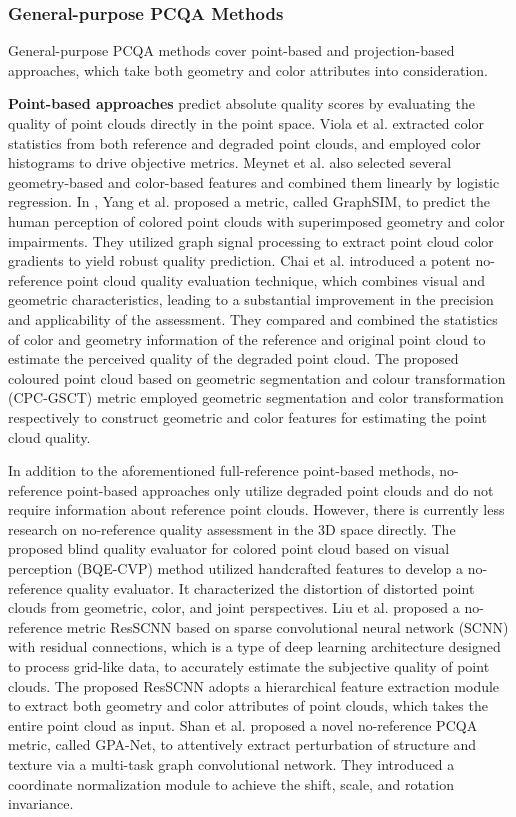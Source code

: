 \subsubsection{General-purpose PCQA Methods}

General-purpose PCQA methods cover point-based and projection-based approaches, which take both geometry and color attributes into consideration.

\textbf{Point-based approaches} predict absolute quality scores by evaluating the quality of point clouds directly in the point space. 
Viola et al. \citep{Violai20} extracted color statistics from both reference and degraded point clouds, and employed color histograms to drive objective metrics.
Meynet et al. \citep{Meynetg20} also selected several geometry-based and color-based features and combined them linearly by logistic regression.
In \citep{Yangq22}, Yang et al. proposed a metric, called GraphSIM, to predict the human perception of colored point clouds with superimposed geometry and color impairments.
They utilized graph signal processing to extract point cloud color gradients to yield robust quality prediction. 
Chai et al. \citep{Chai2024} introduced a potent no-reference point cloud quality evaluation technique, which combines visual and geometric characteristics, leading to a substantial improvement in the precision and applicability of the assessment.
They compared and combined the statistics of color and geometry information of the reference and original point cloud to estimate the perceived quality of the degraded point cloud.
The proposed coloured point cloud based on geometric segmentation and colour transformation (CPC-GSCT) \citep{Hual21} metric employed geometric segmentation and color transformation respectively to construct geometric and color features for estimating the point cloud quality.

In addition to the aforementioned full-reference point-based methods, no-reference point-based approaches only utilize degraded point clouds and do not require information about reference point clouds.
However, there is currently less research on no-reference quality assessment in the 3D space directly.
The proposed blind quality evaluator for colored point cloud based on visual perception (BQE-CVP) method \citep{Hual21cvp} utilized handcrafted features to develop a no-reference quality evaluator.  
It characterized the distortion of distorted point clouds from geometric, color, and joint perspectives.
Liu et al. \citep{Liuyp22} proposed a no-reference metric ResSCNN based on sparse convolutional neural network (SCNN) with residual connections, which is a type of deep learning architecture designed to process grid-like data, to accurately estimate the subjective quality of point clouds.
The proposed ResSCNN adopts a hierarchical feature extraction module to extract both geometry and color attributes of point clouds, which takes the entire point cloud as input.
Shan et al. \citep{Shanzy23} proposed a novel no-reference PCQA metric, called GPA-Net, to attentively extract perturbation of structure and texture via a multi-task graph convolutional network.
They introduced a coordinate normalization module to achieve the shift, scale, and rotation invariance.


